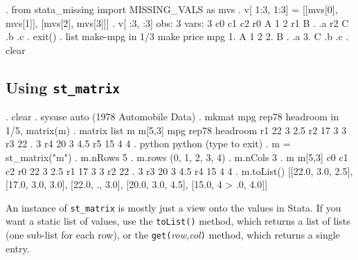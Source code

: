\documentclass{article}
\begin{document}
\begin{stlog}
. from stata_missing import MISSING_VALS as mvs
{\smallskip}
. v[ 1:3, 1:3] = [[mvs[0], mvs[1]], [mvs[2], mvs[3]]]
{\smallskip}
. v[ :3, :3]
{\smallskip}
  obs: 3
 vars: 3
{\smallskip}
            c0        c1        c2
r0           A         1         2
r1           B         .        .a
r2           C        .b        .c
{\smallskip}
. exit()
{\smallskip}
. list make-mpg in 1/3
{\smallskip}
     {\TLC}
     {\VBAR} make   price   mpg {\VBAR}
     {\LFTT}
  1. {\VBAR} A          1     2 {\VBAR}
  2. {\VBAR} B          .    .a {\VBAR}
  3. {\VBAR} C         .b    .c {\VBAR}
     {\BLC}
{\smallskip}
. clear
\end{stlog}

\smallskip



\subsection{Using \lstinline{st_matrix}} \label{st_matrix_example}

\begin{stlog}
. clear
{\smallskip}
. sysuse auto
(1978 Automobile Data)
{\smallskip}
. mkmat mpg rep78 headroom in 1/5, matrix(m)
{\smallskip}
. matrix list m
{\smallskip}
m[5,3]
         mpg     rep78  headroom
r1        22         3       2.5
r2        17         3         3
r3        22         .         3
r4        20         3       4.5
r5        15         4         4
{\smallskip}
. python
 python (type {} to exit) 
. m = st_matrix("m")
{\smallskip}
. m.nRows
5
{\smallskip}
. m.rows
(0, 1, 2, 3, 4)
{\smallskip}
. m.nCols
3
{\smallskip}
. m
{\smallskip}
m[5,3]
           c0         c1         c2
r0         22          3        2.5
r1         17          3          3
r2         22          .          3
r3         20          3        4.5
r4         15          4          4
{\smallskip}
. m.toList()
[[22.0, 3.0, 2.5], [17.0, 3.0, 3.0], [22.0, ., 3.0], [20.0, 3.0, 4.5], [15.0, 4
> .0, 4.0]]
\end{stlog}

\medskip

An instance of \lstinline{st_matrix} is mostly just a view onto the values in Stata. If you want a static list of values, use the \texttt{toList()} method, which returns a list of lists (one sub-list for each row), or the \lstinline{get(}\textit{row,col}\lstinline{)} method, which returns a single entry.
\smallskip
\end{document}
